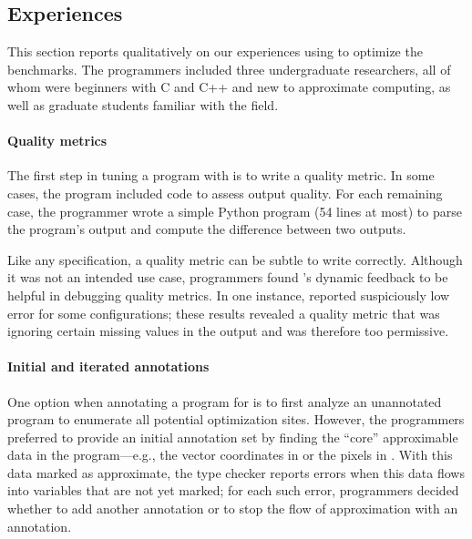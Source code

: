 

\subsection{Experiences}
\label{accept:sec:casestudy}

This section
reports qualitatively on our experiences using \sysname to optimize the benchmarks.
The programmers included three undergraduate researchers, all of whom were
beginners with C and C++ and new to approximate computing,
as well as graduate students familiar with the field.


\paragraph{Quality metrics}
The first step in tuning a program with \sysname is to write a quality metric.
In some cases, the program included code to assess output quality.
For each remaining
case, the programmer wrote a simple Python program (54 lines at most) to parse the
program's output and compute the difference between two outputs.

Like any specification, a quality metric can be subtle to write correctly.
Although it was not an intended use case, programmers found \sysname's dynamic feedback to be helpful in debugging quality metrics.
In one instance, \sysname reported suspiciously low error for some
configurations; these results revealed a quality metric that was ignoring
certain missing values in the output and was therefore too permissive.


\paragraph{Initial and iterated annotations}
One option when annotating a program for \sysname is to first analyze an
unannotated program to enumerate all potential optimization sites.
However, the programmers preferred
to
provide an initial annotation set by finding the ``core''
approximable data in the program---e.g., the vector coordinates in
 or the pixels in . With this data marked as
approximate, the type
checker reports errors when this data flows into variables that are not yet
marked; for each such error, programmers decided whether to add another 
annotation or to stop the flow of approximation with an 
annotation.

